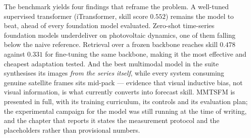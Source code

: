 The benchmark yields four findings that reframe the problem. A well-tuned supervised
transformer (iTransformer, skill score $0.552$) remains the model to beat, ahead of every
foundation model evaluated. Zero-shot time-series foundation models underdeliver on
photovoltaic dynamics, one of them falling below the naive reference. Retrieval over a
frozen backbone reaches skill $0.478$ against $0.331$ for fine-tuning the same backbone,
making it the most effective and cheapest adaptation tested. And the best multimodal model
in the suite synthesises its images \emph{from the series itself}, while every system
consuming genuine satellite frames sits mid-pack --- evidence that visual inductive bias,
not visual information, is what currently converts into forecast skill. MMTSFM is presented
in full, with its training curriculum, its controls and its evaluation plan; the
experimental campaign for the model was still running at the time of writing, and the
chapter that reports it states the measurement protocol and the placeholders rather than
provisional numbers.

\par


